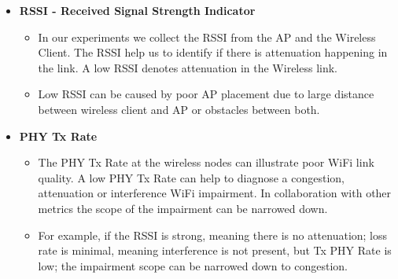 \begin{itemize}
	\item \textbf{RSSI - Received Signal Strength Indicator}
	\begin{itemize}
		\item In our experiments we collect the RSSI from the AP and the Wireless Client. The RSSI help us to identify if there is attenuation happening in the link. A low RSSI denotes attenuation in the Wireless link.
		\item Low RSSI can be caused by poor AP placement due to large distance between wireless client and AP or obstacles between both.
	\end{itemize}
	
	\item \textbf{PHY Tx Rate}
	\begin{itemize}
		\item The PHY Tx Rate at the wireless nodes can illustrate poor WiFi link quality. A low PHY Tx Rate can help to diagnose a congestion, attenuation or interference WiFi impairment. In collaboration with other metrics the scope of the impairment can be narrowed down.
		\item For example, if the RSSI is strong, meaning there is no attenuation; loss rate is minimal, meaning interference is not present, but Tx PHY Rate is low; the impairment scope can be narrowed down to congestion.
	\end{itemize}
	

\end{itemize}

